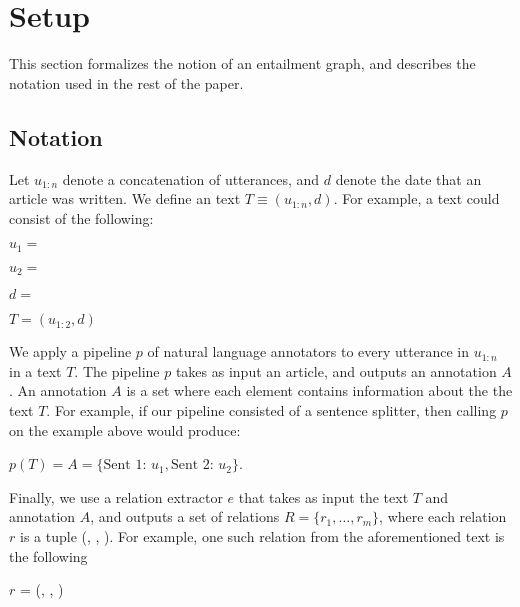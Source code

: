 \section{Setup}
This section formalizes the notion of an entailment graph, and describes
the notation used in the rest of the paper.
\subsection{Notation}
Let $u_{1:n}$ denote a concatenation of utterances, and 
$d$ denote the date that an article was written. We define
an text $T \equiv (u_{1:n}, d)$. For example, a text could consist
of the following:
\begin{description}

  \item $u_1 =$ 
  \item $u_2 =$ 
  \item $d =$  
  \item $T = (u_{1:2}, d)$
\end{description}

We apply a pipeline $p$ of natural language annotators 
to every utterance in $u_{1:n}$ in a text $T$. 
The pipeline $p$ takes as input an article, and outputs an annotation $A$.
An annotation $A$ is a set where each element contains
information about the the text $T$. For example, if our
pipeline consisted of a sentence splitter, then calling $p$
on the example above would produce:
\begin{center}
  $p(T) = A = \{\text{Sent 1: } u_1, \text{Sent 2: } u_2\}$.
\end{center}

Finally, we use a relation extractor $e$ that takes as input
the text $T$ and annotation $A$, and outputs a set of relations $R=\{r_1,\dots,r_m\}$,
where each relation $r$ is a tuple (, , ).
For example, one such relation from the aforementioned text is the following
\begin{center}
  $r$ = (, , )
\end{center}

